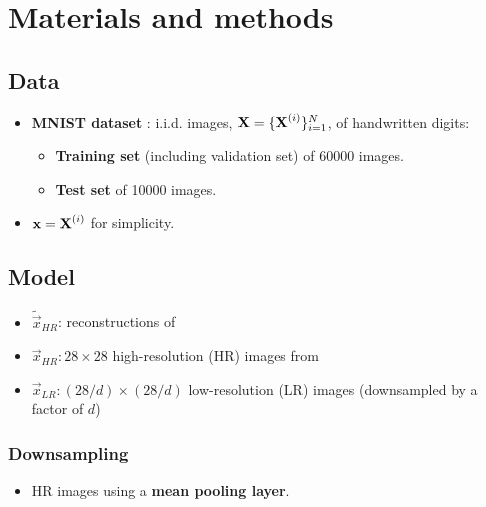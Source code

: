 \section{Materials and methods}
\label{sec:method}

\subsection{Data}
\label{sub:data}
\begin{itemize}
	\item \textbf{MNIST dataset} \cite{MNIST}: i.i.d. images, $\bm{\mathrm{X}} = \{\bm{\mathrm{X}}^{(i)}\}^N_{i=1}$, of handwritten digits:
	\begin{itemize}
		\item \textbf{Training set} (including validation set) of 60000 images.
		\item \textbf{Test set} of 10000 images.
	\end{itemize}
	\item $\bm{\mathrm{x}} = \bm{\mathrm{X}}^{(i)}$ for simplicity.
\end{itemize}

\subsection{Model} %
\label{sub:the_model}

\begin{columnfigure}
	\centering
	
	\label{fig:diagram}
\end{columnfigure}

\begin{itemize}
	
	\item $\tilde{\vec{x}}_{HR}$: reconstructions of
	\item $\vec{x}_{HR}: 28\times 28$ high-resolution (HR) images from
	\item $\vec{x}_{LR}: (28/d)\times (28/d)$ low-resolution (LR) images (downsampled by a factor of $d$)
\end{itemize}

\subsubsection{Downsampling}
\label{ssub:downsampling}

\begin{itemize}
	\item HR images using a \textbf{mean pooling layer}.
\end{itemize}


